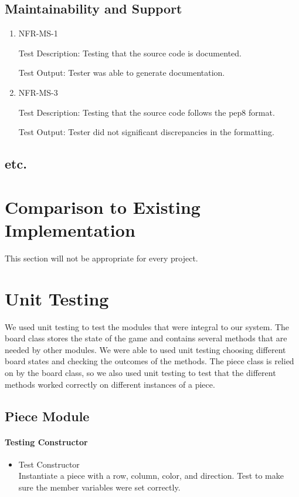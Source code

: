 \documentclass[12pt, titlepage]{article}
\begin{document}
\subsection{Maintainability and Support}
\begin{enumerate}
    \item {NFR-MS-1}

    Test Description: Testing that the source code is documented.
    
    Test Output: Tester was able to generate documentation.
    \item {NFR-MS-3}

    Test Description: Testing that the source code follows the pep8 format.
    
    Test Output: Tester did not significant discrepancies in the formatting.
\end{enumerate}

\subsection{etc.}
	
\section{Comparison to Existing Implementation}	

This section will not be appropriate for every project.

\section{Unit Testing}
We used unit testing to test the modules that were integral to our system. The board class stores the state of the game and contains several methods that are needed by other modules. We were able to used unit testing choosing different board states and checking the outcomes of the methods. The piece class is relied on by the board class, so we also used unit testing to test that the different methods worked correctly on different instances of a piece.

\subsection{Piece Module}
\paragraph{Testing Constructor}
\begin{itemize}
    \item{}Test Constructor\\
    Instantiate a piece with a row, column, color, and direction. Test to make sure the member variables were set correctly.
\end{itemize}
\end{document}

